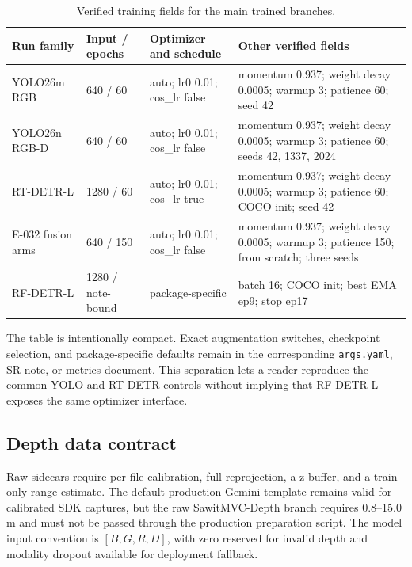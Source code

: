 \documentclass[preprint,12pt]{elsarticle}
\begin{document}
\begin{table}[t]
\centering
\caption{Verified training fields for the main trained branches.}
\label{tab:training-config}
\begin{tabular}{L{0.21\columnwidth}L{0.19\columnwidth}L{0.18\columnwidth}L{0.30\columnwidth}}
\toprule
Run family & Input / epochs & Optimizer and schedule & Other verified fields\\
\midrule
YOLO26m RGB & 640 / 60 & auto; lr0 0.01; cos\_lr false & momentum 0.937; weight decay 0.0005; warmup 3; patience 60; seed 42\\
YOLO26n RGB-D & 640 / 60 & auto; lr0 0.01; cos\_lr false & momentum 0.937; weight decay 0.0005; warmup 3; patience 60; seeds 42, 1337, 2024\\
RT-DETR-L & 1280 / 60 & auto; lr0 0.01; cos\_lr true & momentum 0.937; weight decay 0.0005; warmup 3; patience 60; COCO init; seed 42\\
E-032 fusion arms & 640 / 150 & auto; lr0 0.01; cos\_lr false & momentum 0.937; weight decay 0.0005; warmup 3; patience 150; from scratch; three seeds\\
RF-DETR-L & 1280 / note-bound & package-specific & batch 16; COCO init; best EMA ep9; stop ep17\\
\bottomrule
\end{tabular}
\end{table}

The table is intentionally compact. Exact augmentation switches, checkpoint
selection, and package-specific defaults remain in the corresponding
\texttt{args.yaml}, SR note, or metrics document. This separation lets a
reader reproduce the common YOLO and RT-DETR controls without implying that
RF-DETR-L exposes the same optimizer interface.

\subsection{Depth data contract}
Raw sidecars require per-file calibration, full reprojection, a z-buffer, and
a train-only range estimate. The default production Gemini template remains
valid for calibrated SDK captures, but the raw SawitMVC-Depth branch requires
0.8--15.0 m and must not be passed through the production preparation script.
The model input convention is \([B,G,R,D]\), with zero reserved for invalid
depth and modality dropout available for deployment fallback.
\end{document}
